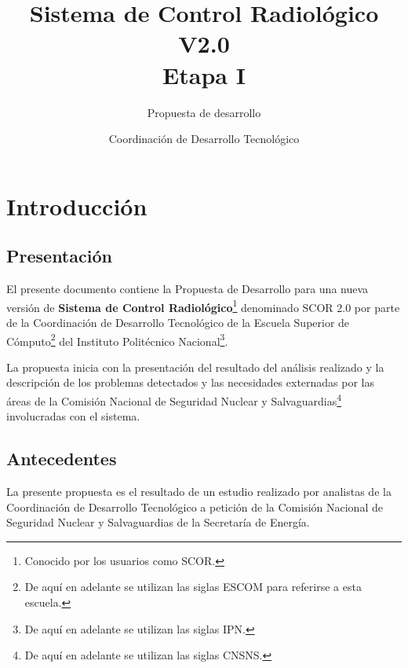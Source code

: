 \documentclass[10pt]{book}
\title{Sistema de Control Radiológico V2.0\\ Etapa I}
\subtitle{\bigskip Propuesta de desarrollo}
\author{Coordinación de Desarrollo Tecnológico}
\begin{document}
\pagestyle{empty}
\maketitle
\frontmatter
\tableofcontents
\mainmatter
\pagestyle{fancy}


\chapter{Introducción} 

\section{Presentación}

	El presente documento contiene la Propuesta de Desarrollo para una nueva versión de {\bf Sistema de Control Radiológico}\footnote{Conocido por los usuarios como SCOR.} denominado SCOR 2.0 por parte de la Coordinación de Desarrollo Tecnológico de la Escuela Superior de Cómputo\footnote{De aquí en adelante se utilizan las siglas ESCOM para referirse a esta escuela.} del Instituto Politécnico Nacional\footnote{De aquí en adelante se utilizan las siglas IPN.}.
	
	La propuesta inicia con la presentación del resultado del análisis realizado y la descripción de los problemas detectados y las necesidades externadas por las áreas de la Comisión Nacional de Seguridad Nuclear y Salvaguardias\footnote{De aquí en adelante se utilizan las siglas CNSNS.} involucradas con el sistema.

\section{Antecedentes} 


	La presente propuesta es el resultado de un estudio realizado por analistas de la Coordinación de Desarrollo Tecnológico a petición de la Comisión Nacional de Seguridad Nuclear y Salvaguardias de la Secretaría de Energía.
	
\end{document}
